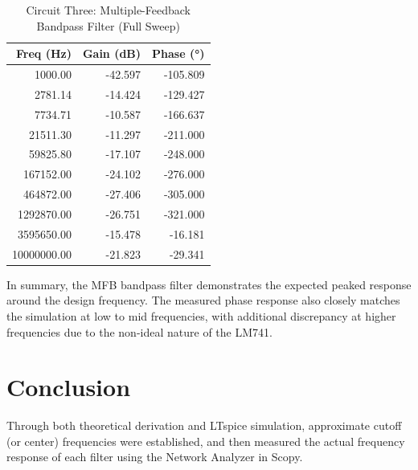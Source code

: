 \documentclass[12pt]{article}
\begin{document}
\begin{table}[H]
\centering
\begin{tabular}{|r|r|r|}
\hline
\textbf{Freq (Hz)} & \textbf{Gain (dB)} & \textbf{Phase (°)} \\
\hline
1000.00    & -42.597 & -105.809 \\
2781.14    & -14.424 & -129.427 \\
7734.71    & -10.587 & -166.637 \\
21511.30   & -11.297 & -211.000 \\
59825.80   & -17.107 & -248.000 \\
167152.00  & -24.102 & -276.000 \\
464872.00  & -27.406 & -305.000 \\
1292870.00 & -26.751 & -321.000 \\
3595650.00 & -15.478 &  -16.181 \\
10000000.00 & -21.823 &  -29.341 \\
\hline
\end{tabular}
\caption{Circuit Three: Multiple-Feedback Bandpass Filter (Full Sweep)}
\label{tab:C3_MFB_full}
\end{table}

In summary, the MFB bandpass filter demonstrates the expected peaked response
around the design frequency. The measured phase response also closely matches
the simulation at low to mid frequencies, with additional discrepancy at higher
frequencies due to the non-ideal nature of the LM741.

\section{Conclusion}
Through both theoretical derivation and LTspice simulation,
approximate cutoff (or center) frequencies were established, and then measured the actual
frequency response of each filter using the Network Analyzer in Scopy.
\end{document}

